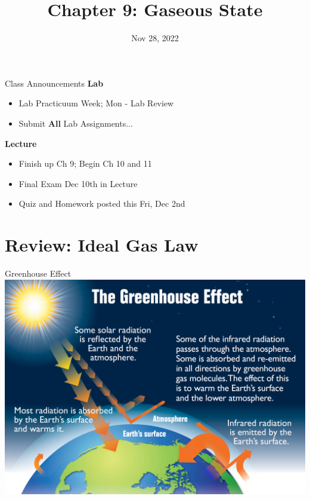 \documentclass[11pt]{beamer}
\title{Chapter 9: Gaseous State}
\institute{Chemistry Department, Cypress College}
\date{Nov 28, 2022}
\begin{document}
\begin{frame}
  \titlepage
\end{frame}

\begin{frame}{Class Announcements}
  \textbf{Lab}
  \begin{itemize}
  \item Lab Practicuum Week; Mon - Lab Review
  \item Submit \textbf{All} Lab Assignments...
  \end{itemize}

  \textbf{Lecture}
  \begin{itemize}
  \item Finish up Ch 9; Begin Ch 10 and 11
  \item Final Exam Dec 10th in Lecture
  \item Quiz and Homework posted this Fri, Dec 2nd
  \end{itemize}
\end{frame}

\section{Review: Ideal Gas Law}

\begin{frame}{Greenhouse Effect}
  \centering
  \includegraphics[width=\linewidth]{greenhouse_effect}
\end{frame}
\end{document}
